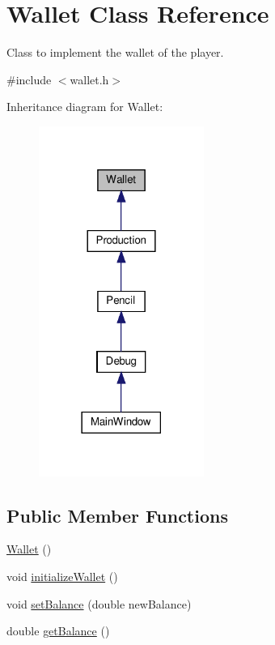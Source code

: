 \hypertarget{classWallet}{}\section{Wallet Class Reference}
\label{classWallet}


Class to implement the wallet of the player.  




{\ttfamily \#include $<$wallet.\+h$>$}



Inheritance diagram for Wallet\+:
\nopagebreak
\begin{figure}[H]
\begin{center}
\leavevmode
\includegraphics[width=153pt]{classWallet__inherit__graph}
\end{center}
\end{figure}
\subsection*{Public Member Functions}
\begin{DoxyCompactItemize}
\item 
\hyperlink{classWallet_ad9be9e49244b78db9099fcaeccd1af04}{Wallet} ()
\item 
void \hyperlink{classWallet_a78d2d2fcbaa3e026673692ccb66e4c58}{initialize\+Wallet} ()
\item 
void \hyperlink{classWallet_a84887f86d53ddf090421365c8ac52661}{set\+Balance} (double new\+Balance)
\item 
double \hyperlink{classWallet_a87b3f7dec77a607a67df9c5d5503b3c6}{get\+Balance} ()
\end{DoxyCompactItemize}
